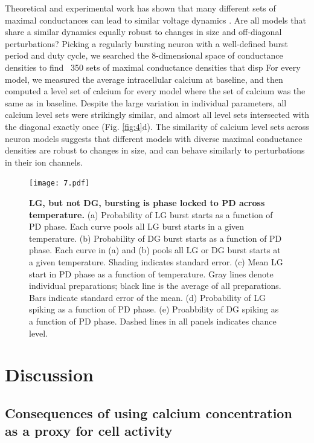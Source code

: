 \documentclass[9pt,lineno]{elife}
\begin{document}
Theoretical and experimental work has shown that many different sets of maximal conductances can lead to similar voltage dynamics \citep{Prinz:2003eza,Golowasch:2002cza,Goldman:2001vva,Taylor:2009kb, Marder:2011de,Caplan:2014jd,Swensen:2005bo, Aizenman:2003fc}. Are all models that share a similar dynamics equally robust to changes in size and off-diagonal perturbations? Picking a regularly bursting neuron with a well-defined burst period and duty cycle, we searched the 8-dimensional space of conductance densities to find ~350 sets of maximal conductance densities that disp For every model, we measured the average intracellular calcium at baseline, and then computed a level set of calcium for every model where the set of calcium was the same as in baseline. Despite the large variation in individual parameters, all calcium level sets were strikingly similar, and almost all level sets intersected with the diagonal exactly once (Fig. \ref{fig:4}d). The similarity of calcium level sets across neuron models suggests that different models with diverse maximal conductance densities are  robust to changes in size, and can behave similarly to perturbations in their ion channels. 


\begin{figure}[!htp]
\centering
\begin{fullwidth}
\texttt{[image: 7.pdf]}
\end{fullwidth}
\caption{\textbf{LG, but not DG, bursting is phase locked to PD across temperature.} (a) Probability of LG burst starts as a function of PD phase. Each curve pools all LG burst starts in a given temperature.  (b) Probability of DG burst starts as a function of PD phase. Each curve in (a) and (b) pools all LG or DG burst starts at a given temperature. Shading indicates standard error.  (c) Mean LG start in PD phase as a function of temperature. Gray lines denote individual preparations; black line is the average of all preparations. Bars indicate standard error of the mean. (d) Probability of LG spiking as a function of PD phase. (e) Proabbility of DG spiking as a function of PD phase.  Dashed lines in all panels indicates chance level.}
\end{figure}


\section{Discussion}




\subsection{Consequences of using calcium concentration as a proxy for cell activity}
\end{document}
